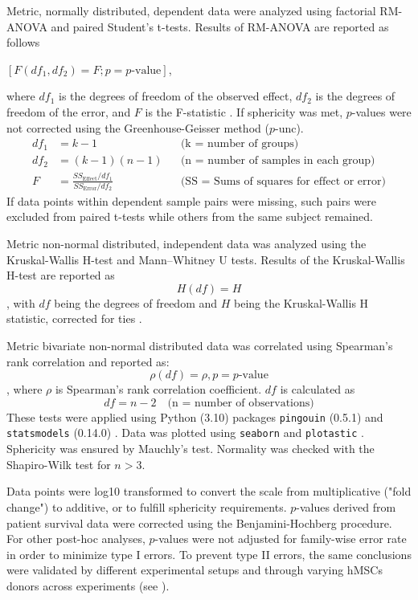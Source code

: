 Metric, normally distributed, dependent data were analyzed using factorial
RM-ANOVA and paired Student's t-tests. Results of RM-ANOVA are reported as
follows
\begin{center}
    \([F(df_1, df_2) = F; p = p\text{-value}]\),
\end{center}
where \(df_1\) is the degrees of freedom of the observed effect, \(df_2\) is the
degrees of freedom of the error, and \(F\) is the F-statistic
\cite{vallatPingouinStatisticsPython2018}. If sphericity was met, \(p\)-values
were not corrected using the Greenhouse-Geisser method (\(p\)-unc).
\begin{align*}
    df_1 & = k - 1                                                      &  & \text{(k = number of groups)}                     \\
    df_2 & = (k - 1)(n - 1)                                             &  & \text{(n = number of samples in each group)}      \\
    F    & = \frac{SS_{\text{Effect}} / df_1}{SS_{\text{Error}} / df_2} &  & \text{(SS = Sums of squares for effect or error)}
\end{align*}
If data points within dependent sample pairs were missing, such pairs were
excluded from paired t-tests while others from the same subject remained.

Metric non-normal distributed, independent data was analyzed using the
Kruskal-Wallis H-test and Mann–Whitney U tests. Results of the Kruskal-Wallis
H-test are reported as
\[H(df) = H\], with \(df\) being the degrees of freedom
and \(H\) being the Kruskal-Wallis H statistic, corrected for ties
\cite{vallatPingouinStatisticsPython2018}.

Metric bivariate non-normal distributed data was correlated using Spearman's
rank correlation and reported as: \[\rho (df) = \rho, p = p\text{-value}\],
where \(\rho\) is Spearman's rank correlation coefficient. \(df\) is calculated
as
\[
    df = n - 2 \quad \text{(n = number of observations)}
\]
These tests were applied using Python (3.10) packages \texttt{pingouin} (0.5.1)
and \texttt{statsmodels} (0.14.0)
\cite{seaboldStatsmodelsEconometricStatistical2010,vallatPingouinStatisticsPython2018}. Data was plotted
using \texttt{seaborn} \cite{waskomSeabornStatisticalData2021} and \texttt{plotastic}
\cite{kuricPlotasticBridgingPlotting2024}. Sphericity was ensured by Mauchly's
test. Normality was checked with the Shapiro-Wilk test for \(n > 3\).

Data points were log10 transformed to convert the scale from multiplicative
("fold change") to additive, or to fulfill sphericity requirements. \(p\)-values
derived from patient survival data were corrected using the Benjamini-Hochberg
procedure. For other post-hoc analyses, \(p\)-values were not adjusted for
family-wise error rate in order to minimize type I errors. To prevent type II
errors, the same conclusions were validated by different experimental setups and
through varying hMSCs donors across experiments (see ).

